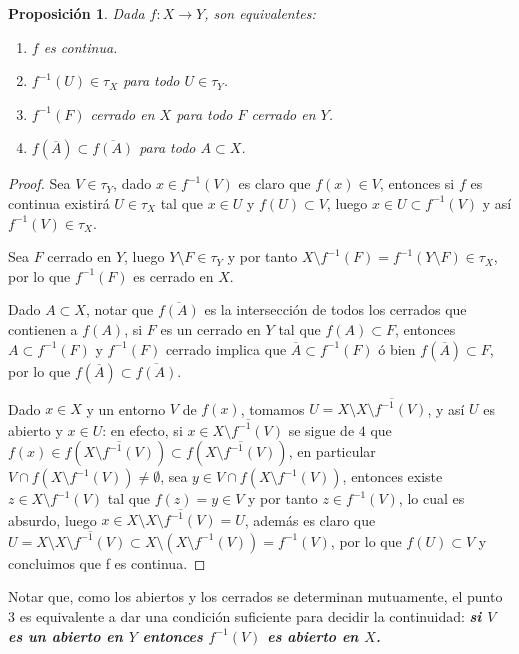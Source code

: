 \documentclass[12pt]{article}
\newtheorem{proposition}[theorem]{Proposición}
\begin{document}
\begin{proposition}Dada $f \colon X \longrightarrow Y$, son equivalentes:
\begin{enumerate}
\item $f$ es continua.
\item $f^{-1}(U) \in \tau_X$ para todo $U \in \tau_Y$.
\item $f^{-1}(F)$ cerrado en $X$ para todo $F$ cerrado en $Y$.
\item $f(\overline{A}) \subset \overline{f(A)}$ para todo $A \subset X$.
\end{enumerate}
\end{proposition}
\begin{proof}
Sea $V \in \tau_Y$, dado $x \in f^{-1}(V)$ es claro que $f(x) \in V$, entonces si $f$ es continua existirá $U \in \tau_X$ tal que $x \in U$ y $f(U) \subset V$, luego $x \in U \subset f^{-1}(V)$ y así $f^{-1}(V) \in \tau_X$.

Sea $F$ cerrado en $Y$, luego $Y\setminus F \in \tau_Y$ y por tanto $X \setminus f^{-1}(F) = f^{-1}(Y \setminus F) \in \tau_X$, por lo que $f^{-1}(F)$ es cerrado en $X$.

Dado $A \subset X$, notar que $\overline{f(A)}$ es la intersección de todos los cerrados que contienen a $f(A)$, si $F$ es un cerrado en $Y$ tal que $f(A) \subset F$, entonces $A \subset f^{-1}(F)$ y $f^{-1}(F)$ cerrado implica que $\overline{A} \subset f^{-1}(F)$ ó bien $f(\overline{A}) \subset F$, por lo que $f(\overline{A}) \subset \overline{f(A)}$. 

Dado $x \in X$ y un entorno $V$ de $f(x)$, tomamos $U = X\setminus \overline{X\setminus f^{-1}(V)}$, y así $U$ es abierto y $x \in U$: en efecto, si $x \in \overline{X \setminus f^{-1}(V)}$ se sigue de $4$ que $f(x) \in f(\overline{X\setminus f^{-1}(V)} ) \subset f(\overline{X\setminus f^{-1}(V)})$, en particular $V \cap f(X \setminus f^{-1}(V)) \neq \emptyset$, sea $y \in V \cap f(X \setminus f^{-1}(V))$, entonces existe $z \in X \setminus f^{-1}(V)$ tal que $f(z) = y \in V$ y por tanto $z \in f^{-1}(V)$, lo cual es absurdo, luego $x \in X \setminus \overline{X\setminus f^{-1}(V)} = U$, además es claro que $U = X\setminus \overline{X\setminus f^{-1}(V)} \subset X \setminus (X\setminus f^{-1}(V)) = f^{-1}(V)$, por lo que $f(U) \subset V$ y concluimos que f es continua. 

\end{proof}

Notar que, como los abiertos y los cerrados se determinan mutuamente, el punto $3$ es equivalente a dar una condición suficiente para decidir la continuidad: \textbf{\textit{si $V$ es un abierto en $Y$ entonces $f^{-1}(V)$ es abierto en $X$.}}
\end{document}
